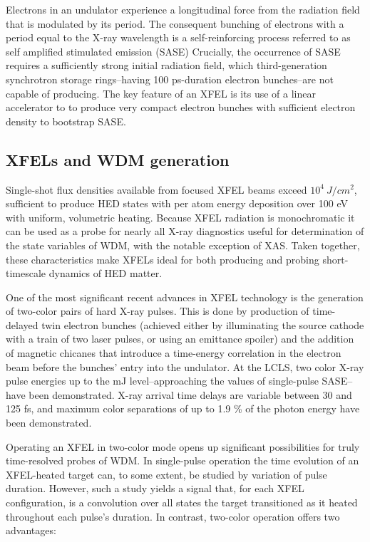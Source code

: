 \documentclass [11pt, proquest, article] {uwthesis}[2016/11/22]
\begin{document}
Electrons in an undulator experience a longitudinal force from the radiation field that is modulated by its period. 
The consequent bunching of electrons with a period equal to the X-ray wavelength is a self-reinforcing process referred to as self amplified stimulated emission (SASE)%
Crucially, the occurrence of SASE requires a sufficiently strong initial radiation field, \cite{milton2001exponential} which third-generation synchrotron storage rings--having 100 ps-duration electron bunches--are not capable of producing. The key feature of an XFEL is its use of a linear accelerator to to produce very compact electron bunches with sufficient electron density to bootstrap SASE.



\subsection{XFELs and WDM generation}
Single-shot flux densities available from focused XFEL beams exceed $10^4~J/cm^2$, sufficient to produce HED states with per atom energy deposition over 100 eV with uniform, volumetric heating.  Because XFEL radiation is monochromatic it can be used as a probe for nearly all X-ray diagnostics useful for determination of the state variables of WDM, with the notable exception of XAS.  Taken together, these characteristics make XFELs ideal for both producing and probing short-timescale dynamics of HED matter.%

One of the most significant recent advances in XFEL technology is the generation of two-color pairs of hard X-ray pulses. This is done by production of time-delayed twin electron bunches (achieved either by illuminating the source cathode with a train of two laser pulses, or using an emittance spoiler) and the addition of magnetic chicanes that introduce a time-energy correlation in the electron beam before the bunches' entry into the undulator.\cite{marinelli2013multicolor} At the LCLS, two color X-ray pulse energies up to the mJ level--approaching the values of single-pulse SASE--have been demonstrated. \cite{marinelli2015high} X-ray arrival time delays are variable between 30 and 125 fs, and maximum color separations of up to 1.9 \% of the photon energy have been demonstrated.\cite{lutman2014demonstration}

Operating an XFEL in two-color mode opens up significant possibilities for truly time-resolved probes of WDM. In single-pulse operation the time evolution of an XFEL-heated target can, to some extent, be studied by variation of pulse duration. However, such a study yields a signal that, for each XFEL configuration, is a convolution over all states the target transitioned as it heated throughout each pulse's duration. In contrast, two-color operation offers two advantages:
\end{document}
